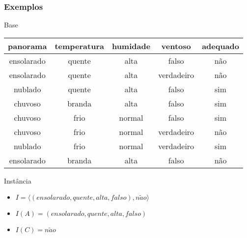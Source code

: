 \begin{frame}
    \frametitle{Exemplos}

    \begin{block}{Base}
        \begin{table}
            \centering
            \begin{tabular}{ccccc}
                \hline
                panorama & temperatura & humidade & ventoso & adequado \\
                \hline
                ensolarado & quente & alta & falso & não \\
                ensolarado & quente & alta & verdadeiro & não \\
                nublado & quente & alta & falso & sim \\
                chuvoso & branda & alta & falso & sim \\
                chuvoso & frio & normal & falso & sim \\
                chuvoso & frio & normal & verdadeiro & não \\
                nublado & frio & normal & verdadeiro & sim \\
                ensolarado & branda & alta & falso & não \\
                \hline
            \end{tabular}
        \end{table}
    \end{block}

    \begin{block}{Instância}
        \begin{itemize}
            \item $I = \langle (ensolarado, quente, alta, falso), n\tilde{a}o \rangle$
            \item $I(A) = (ensolarado, quente, alta, falso)$
            \item $I(C) = n\tilde{a}o$
        \end{itemize}
    \end{block}
\end{frame}

